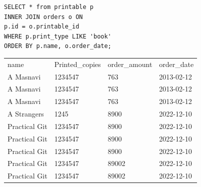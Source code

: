 \documentclass{article}
\begin{document}
\begin{flushleft}
	
\end{flushleft}

\begin{lstlisting}[frame=single]
SELECT * from printable p 
INNER JOIN orders o ON 
p.id = o.printable_id
WHERE p.print_type LIKE 'book'
ORDER BY p.name, o.order_date;
\end{lstlisting}
\begin{table}[h]
\begin{tabular}{llll}
name          & Printed\_copies & order\_amount & order\_date \\
A Masnavi     & 1234547         & 763           & 2013-02-12  \\
A Masnavi     & 1234547         & 763           & 2013-02-12  \\
A Masnavi     & 1234547         & 763           & 2013-02-12  \\
A Strangers   & 1245            & 8900          & 2022-12-10  \\
Practical Git & 1234547         & 8900          & 2022-12-10  \\
Practical Git & 1234547         & 8900          & 2022-12-10  \\
Practical Git & 1234547         & 8900          & 2022-12-10  \\
Practical Git & 1234547         & 89002         & 2022-12-10  \\
Practical Git & 1234547         & 89002         & 2022-12-10 
\end{tabular}
\end{table}
\end{document}
